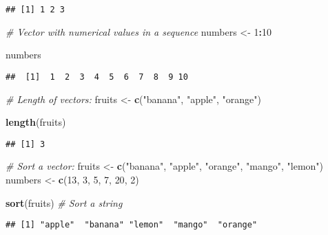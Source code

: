 \documentclass[
]{article}
\newenvironment{Shaded}{\begin{snugshade}}{\end{snugshade}}
\newcommand{\CommentTok}[1]{\textcolor[rgb]{0.56,0.35,0.01}{\textit{#1}}}
\newcommand{\DecValTok}[1]{\textcolor[rgb]{0.00,0.00,0.81}{#1}}
\newcommand{\FunctionTok}[1]{\textcolor[rgb]{0.13,0.29,0.53}{\textbf{#1}}}
\newcommand{\NormalTok}[1]{#1}
\newcommand{\OtherTok}[1]{\textcolor[rgb]{0.56,0.35,0.01}{#1}}
\newcommand{\SpecialCharTok}[1]{\textcolor[rgb]{0.81,0.36,0.00}{\textbf{#1}}}
\newcommand{\StringTok}[1]{\textcolor[rgb]{0.31,0.60,0.02}{#1}}
\begin{document}
\begin{verbatim}
## [1] 1 2 3
\end{verbatim}

\begin{Shaded}
\begin{Highlighting}[]
\CommentTok{\# Vector with numerical values in a sequence}
\NormalTok{numbers }\OtherTok{\textless{}{-}} \DecValTok{1}\SpecialCharTok{:}\DecValTok{10}

\NormalTok{numbers}
\end{Highlighting}
\end{Shaded}

\begin{verbatim}
##  [1]  1  2  3  4  5  6  7  8  9 10
\end{verbatim}

\begin{Shaded}
\begin{Highlighting}[]
\CommentTok{\# Length of vectors:}
\NormalTok{fruits }\OtherTok{\textless{}{-}} \FunctionTok{c}\NormalTok{(}\StringTok{"banana"}\NormalTok{, }\StringTok{"apple"}\NormalTok{, }\StringTok{"orange"}\NormalTok{)}

\FunctionTok{length}\NormalTok{(fruits)}
\end{Highlighting}
\end{Shaded}

\begin{verbatim}
## [1] 3
\end{verbatim}

\begin{Shaded}
\begin{Highlighting}[]
\CommentTok{\# Sort a vector:}
\NormalTok{fruits }\OtherTok{\textless{}{-}} \FunctionTok{c}\NormalTok{(}\StringTok{"banana"}\NormalTok{, }\StringTok{"apple"}\NormalTok{, }\StringTok{"orange"}\NormalTok{, }\StringTok{"mango"}\NormalTok{, }\StringTok{"lemon"}\NormalTok{)}
\NormalTok{numbers }\OtherTok{\textless{}{-}} \FunctionTok{c}\NormalTok{(}\DecValTok{13}\NormalTok{, }\DecValTok{3}\NormalTok{, }\DecValTok{5}\NormalTok{, }\DecValTok{7}\NormalTok{, }\DecValTok{20}\NormalTok{, }\DecValTok{2}\NormalTok{)}

\FunctionTok{sort}\NormalTok{(fruits)  }\CommentTok{\# Sort a string}
\end{Highlighting}
\end{Shaded}

\begin{verbatim}
## [1] "apple"  "banana" "lemon"  "mango"  "orange"
\end{verbatim}
\end{document}
